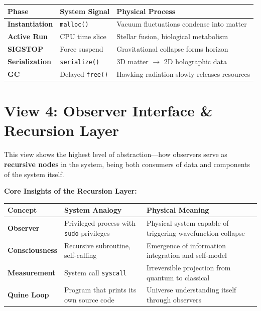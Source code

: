 \documentclass[11pt,a4paper,twoside]{book}
\begin{document}
\begin{table}[h]
\centering
\begin{tabular}{|l|l|l|}
\hline
\textbf{Phase} & \textbf{System Signal} & \textbf{Physical Process} \\
\hline
\textbf{Instantiation} & \texttt{malloc()} & Vacuum fluctuations condense into matter \\
\hline
\textbf{Active Run} & CPU time slice & Stellar fusion, biological metabolism \\
\hline
\textbf{SIGSTOP} & Force suspend & Gravitational collapse forms horizon \\
\hline
\textbf{Serialization} & \texttt{serialize()} & 3D matter $\to$ 2D holographic data \\
\hline
\textbf{GC} & Delayed \texttt{free()} & Hawking radiation slowly releases resources \\
\hline
\end{tabular}
\end{table}

\section{View 4: Observer Interface \& Recursion Layer}

This view shows the highest level of abstraction---how observers serve as \textbf{recursive nodes} in the system, being both consumers of data and components of the system itself.

\textbf{Core Insights of the Recursion Layer:}

\begin{table}[h]
\centering
\begin{tabular}{|l|l|l|}
\hline
\textbf{Concept} & \textbf{System Analogy} & \textbf{Physical Meaning} \\
\hline
\textbf{Observer} & Privileged process with \texttt{sudo} privileges & Physical system capable of triggering wavefunction collapse \\
\hline
\textbf{Consciousness} & Recursive subroutine, self-calling & Emergence of information integration and self-model \\
\hline
\textbf{Measurement} & System call \texttt{syscall} & Irreversible projection from quantum to classical \\
\hline
\textbf{Quine Loop} & Program that prints its own source code & Universe understanding itself through observers \\
\hline
\end{tabular}
\end{table}
\end{document}
